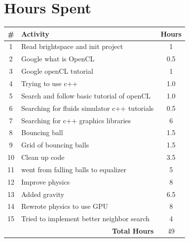 \documentclass{article}
\begin{document}
\section*{Hours Spent}
\begin{tabular}{|c|l|c|}
    \hline
    \#                                         & Activity                                     & Hours \\
    \hline
    1                                          & Read brightspace and init project            & 1     \\
    2                                          & Google what is OpenCL                        & 0.5   \\
    3                                          & Google openCL tutorial                       & 1     \\
    4                                          & Trying to use c++                            & 1.0   \\
    5                                          & Search and follow basic tutorial of openCL   & 1.0   \\
    6                                          & Searching for fluids simulator c++ tutorials & 0.5   \\
    7                                          & Searching for c++ graphics libraries         & 6     \\
    8                                          & Bouncing ball                                & 1.5   \\
    9                                          & Grid of bouncing balls                       & 1.5   \\
    10                                         & Clean up code                                & 3.5   \\
    11                                         & went from falling balls to equalizer         & 5     \\
    12                                         & Improve physics                              & 8     \\
    13                                         & Added gravity                                & 6.5   \\
    14                                         & Rewrote physics to use GPU                   & 8     \\
    15                                         & Tried to implement better neighbor search    & 4     \\
    \hline
    \multicolumn{2}{|r|}{\textbf{Total Hours}} & 49                                                   \\
    \hline
\end{tabular}
\end{document}
